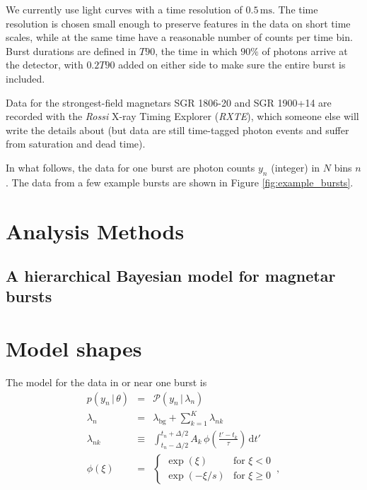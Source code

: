 \documentclass[12pt]{article}
\newcommand{\project}[1]{\textsl{#1}}
\newcommand{\RXTE}{\project{RXTE}}
\newcommand{\given}{\,|\,}
\newcommand{\dd}{\mathrm{d}}
\renewcommand{\count}{y}
\newcommand{\pars}{\theta}
\newcommand{\mean}{\lambda}
\newcommand{\Poisson}{{\mathcal P}}
\newcommand{\bg}{\mathrm{bg}}
\newcommand{\word}{\phi}
\begin{document}
We currently use light curves with a time resolution of $0.5\,\mathrm{ms}$. The time resolution is chosen small enough to preserve features
in the data on short time scales, while at the same time have a reasonable number of counts per time bin. 
Burst durations are defined in $T90$, the time in which $90\%$ of photons arrive at the detector, with $0.2T90$ added on either side
to make sure the entire burst is included. 

Data for the strongest-field magnetars SGR 1806-20 and SGR 1900+14 are recorded with the {\it Rossi} X-ray Timing Explorer (\RXTE), which someone
else will write the details about (but data are still time-tagged photon events and suffer from saturation and dead time). 


In what follows, the data for one burst are photon counts $\count_n$ (integer) in $N$ bins $n$.
The data from a few example bursts are shown in Figure \ref{fig:example_bursts}.


\section{Analysis Methods}


\subsection{A hierarchical Bayesian model for magnetar bursts}



\section{Model shapes}

The model for the data in or near one burst is
\begin{eqnarray}
p(\count_n\given\pars) &=& \Poisson(\count_n\given\mean_n)
\\
\mean_n &=& \mean_{\bg} + \sum_{k=1}^K \mean_{nk}
\\
\mean_{nk} &\equiv& \int_{t_n-\Delta/2}^{t_n+\Delta/2} A_k\,\word(\frac{t'-t_k}{\tau})\,\dd t'
\\
\word(\xi) &=& \left\{\begin{array}{ll}\exp(\xi) & \mbox{for $\xi<0$}\\ \exp(-\xi/s) & \mbox{for $\xi\geq 0$}\end{array}\right. \, ,
\end{eqnarray}
\end{document}
